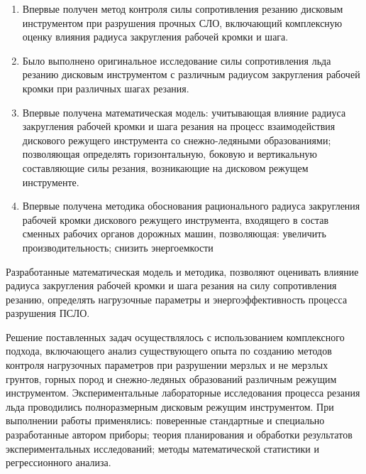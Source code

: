 {\novelty}
\begin{enumerate}
  \item Впервые получен метод контроля силы сопротивления резанию дисковым инструментом при разрушения прочных СЛО, включающий комплексную оценку влияния радиуса закругления рабочей кромки и шага.
  \item Было выполнено оригинальное исследование силы сопротивления льда резанию дисковым инструментом с различным радиусом закругления рабочей кромки при различных шагах резания.
  \item Впервые получена математическая модель: учитывающая влияние радиуса закругления рабочей кромки и шага резания на процесс взаимодействия дискового режущего инструмента со снежно-ледяными образованиями; позволяющая определять горизонтальную, боковую и вертикальную  составляющие силы резания, возникающие на дисковом режущем инструменте.
  \item Впервые получена методика обоснования рационального радиуса закругления рабочей кромки дискового режущего инструмента, входящего в состав сменных рабочих органов дорожных машин, позволяющая: увеличить производительность; снизить энергоемкости 
\end{enumerate}

{\influence} Разработанные математическая модель и методика, позволяют оценивать влияние радиуса закругления рабочей кромки и шага резания на силу сопротивления резанию, определять нагрузочные параметры и энергоэффективность процесса разрушения ПСЛО.

{\methods} Решение поставленных задач осуществлялось с использованием комплексного подхода, включающего анализ существующего опыта по созданию методов контроля нагрузочных параметров при разрушении мерзлых и не мерзлых грунтов, горных пород и снежно-ледяных образований различным режущим инструментом. Экспериментальные лабораторные исследования процесса резания льда проводились полноразмерным дисковым режущим инструментом. При выполнении работы применялись: поверенные стандартные и специально разработанные автором приборы; теория планирования и обработки результатов экспериментальных исследований; методы математической статистики и регрессионного анализа.

